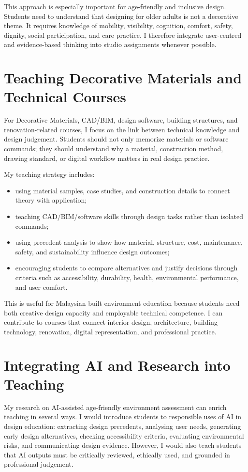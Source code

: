 \documentclass[11pt,a4paper]{article}
\begin{document}
This approach is especially important for age-friendly and inclusive design. Students need to understand that designing for older adults is not a decorative theme. It requires knowledge of mobility, visibility, cognition, comfort, safety, dignity, social participation, and care practice. I therefore integrate user-centred and evidence-based thinking into studio assignments whenever possible.

\section*{Teaching Decorative Materials and Technical Courses}
For Decorative Materials, CAD/BIM, design software, building structures, and renovation-related courses, I focus on the link between technical knowledge and design judgement. Students should not only memorize materials or software commands; they should understand why a material, construction method, drawing standard, or digital workflow matters in real design practice.

My teaching strategy includes:
\begin{itemize}
  \item using material samples, case studies, and construction details to connect theory with application;
  \item teaching CAD/BIM/software skills through design tasks rather than isolated commands;
  \item using precedent analysis to show how material, structure, cost, maintenance, safety, and sustainability influence design outcomes;
  \item encouraging students to compare alternatives and justify decisions through criteria such as accessibility, durability, health, environmental performance, and user comfort.
\end{itemize}

This is useful for Malaysian built environment education because students need both creative design capacity and employable technical competence. I can contribute to courses that connect interior design, architecture, building technology, renovation, digital representation, and professional practice.

\section*{Integrating AI and Research into Teaching}
My research on AI-assisted age-friendly environment assessment can enrich teaching in several ways. I would introduce students to responsible uses of AI in design education: extracting design precedents, analysing user needs, generating early design alternatives, checking accessibility criteria, evaluating environmental risks, and communicating design evidence. However, I would also teach students that AI outputs must be critically reviewed, ethically used, and grounded in professional judgement.
\end{document}
